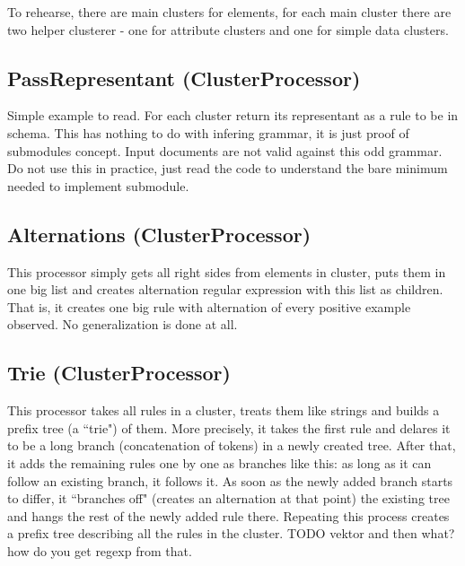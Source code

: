 \documentclass[a4paper,10pt,oneside]{article}
\begin{document}
To rehearse, there are main clusters for elements, for each main cluster there are two helper clusterer - one for attribute clusters and one for simple data clusters.

\subsection{PassRepresentant (ClusterProcessor)} \label{section_PassRepresentant}
Simple example to read. For each cluster return its representant as a rule to be in schema.
This has nothing to do with infering grammar, it is just proof of submodules concept.
Input documents are not valid against this odd grammar.
Do not use this in practice, just read the code to understand the bare minimum needed to implement submodule.

\subsection{Alternations (ClusterProcessor)} \label{section_Alternations}
This processor simply gets all right sides from elements in cluster, puts them in one big list and creates alternation regular expression with this list as children.
That is, it creates one big rule with alternation of every positive example observed.
No generalization is done at all.

\subsection{Trie (ClusterProcessor)} \label{section_Trie}
This processor takes all rules in a cluster, treats them like strings and builds a prefix tree (a ``trie") of them. More precisely, it takes the first rule and delares it to be a long branch (concatenation of tokens) in a newly created tree. After that, it adds the remaining rules one by one as branches like this: as long as it can follow an existing branch, it follows it. As soon as the newly added branch starts to differ, it ``branches off" (creates an alternation at that point) the existing tree and hangs the rest of the newly added rule there. Repeating this process creates a prefix tree describing all the rules in the cluster.
TODO vektor and then what? how do you get regexp from that.

\end{document}
